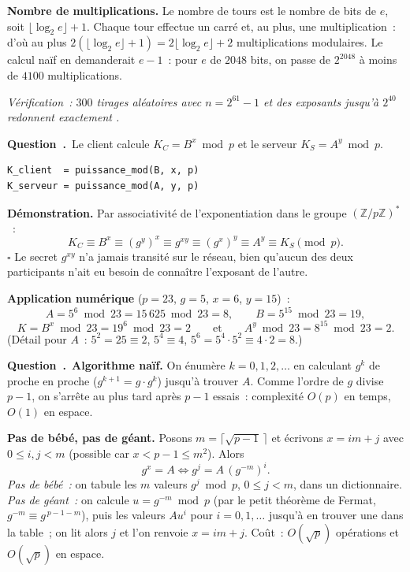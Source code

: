 \documentclass[11pt,a4paper]{article}
\renewcommand{\Q}{\medskip\par\stepcounter{qcnt}\noindent\textbf{\color{cnc}Question~\theqcnt.}~}
\begin{document}
\textbf{Nombre de multiplications.} Le nombre de tours est le nombre de bits de $e$, soit
$\lfloor\log_2 e\rfloor+1$. Chaque tour effectue un carré et, au plus, une multiplication~:
d'où au plus $2(\lfloor\log_2 e\rfloor+1)=2\lfloor\log_2 e\rfloor+2$ multiplications
modulaires. Le calcul naïf en demanderait $e-1$~: pour $e$ de $2048$ bits, on passe de
$2^{2048}$ à moins de $4100$ multiplications.

\emph{Vérification~: $300$ tirages aléatoires avec $n=2^{61}-1$ et des exposants jusqu'à
$2^{40}$ redonnent exactement .}

\Q Le client calcule $K_C=B^{x}\bmod p$ et le serveur $K_S=A^{y}\bmod p$.
\begin{lstlisting}
K_client  = puissance_mod(B, x, p)
K_serveur = puissance_mod(A, y, p)
\end{lstlisting}
\textbf{Démonstration.} Par associativité de l'exponentiation dans le groupe
$(\mathbb{Z}/p\mathbb{Z})^{*}$~:
\[ K_C \equiv B^{x} \equiv (g^{y})^{x} \equiv g^{xy} \equiv (g^{x})^{y} \equiv A^{y}
\equiv K_S \pmod p . \]
\hfill$\square$ Le secret $g^{xy}$ n'a jamais transité sur le réseau, bien qu'aucun des deux
participants n'ait eu besoin de connaître l'exposant de l'autre.

\textbf{Application numérique} ($p=23$, $g=5$, $x=6$, $y=15$)~:
\[ A=5^{6}\bmod 23 = 15\,625 \bmod 23 = \boxed{8},\qquad
   B=5^{15}\bmod 23 = \boxed{19}, \]
\[ K = B^{x}\bmod 23 = 19^{6}\bmod 23 = \boxed{2}
    \qquad\text{et}\qquad A^{y}\bmod 23 = 8^{15}\bmod 23 = 2 . \]
(Détail pour $A$~: $5^2=25\equiv 2$, $5^4\equiv 4$, $5^6=5^4\cdot 5^2\equiv 4\cdot 2=8$.)

\Q \textbf{Algorithme naïf.} On énumère $k=0,1,2,\dots$ en calculant $g^{k}$ de proche en
proche ($g^{k+1}=g\cdot g^{k}$) jusqu'à trouver $A$. Comme l'ordre de $g$ divise $p-1$, on
s'arrête au plus tard après $p-1$ essais~: complexité $O(p)$ en temps, $O(1)$ en espace.

\textbf{Pas de bébé, pas de géant.} Posons $m=\lceil\sqrt{p-1}\,\rceil$ et écrivons
$x=im+j$ avec $0\le i,j<m$ (possible car $x<p-1\le m^2$). Alors
\[ g^{x}=A \iff g^{j}= A\,(g^{-m})^{i}. \]
\emph{Pas de bébé~:} on tabule les $m$ valeurs $g^{j}\bmod p$, $0\le j<m$, dans un
dictionnaire. \emph{Pas de géant~:} on calcule $u=g^{-m}\bmod p$ (par le petit théorème de
Fermat, $g^{-m}\equiv g^{\,p-1-m}$), puis les valeurs $A u^{i}$ pour $i=0,1,\dots$ jusqu'à en
trouver une dans la table~; on lit alors $j$ et l'on renvoie $x=im+j$. Coût~:
$O(\sqrt{p})$ opérations et $O(\sqrt{p})$ en espace.
\end{document}
